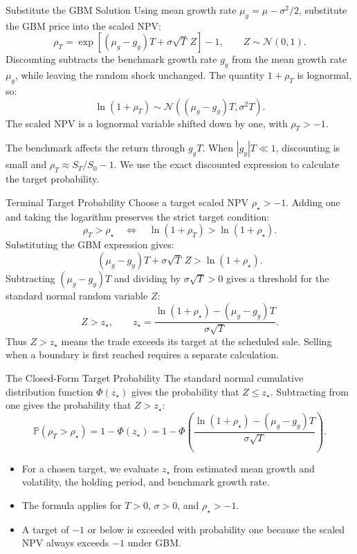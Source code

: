 \documentclass[aspectratio=169,11pt]{beamer}
\newcommand{\Pmeasure}{\mathbb{P}}
\newcommand{\mug}{\mu_g}
\begin{document}
\begin{frame}{Substitute the GBM Solution}
  Using mean growth rate $\mug=\mu-\sigma^2/2$, substitute the GBM price into
  the scaled NPV:
  \[
    \boxed{\rho_T=\exp\!\left[(\mug-g_y)T+\sigma\sqrt T\,Z\right]-1,
      \qquad Z\sim\mathcal N(0,1).}
  \]
  Discounting subtracts the benchmark growth rate $g_y$ from the mean growth
  rate $\mug$, while leaving the random shock unchanged. The quantity
  $1+\rho_T$ is lognormal, so:
  \[
    \ln(1+\rho_T)\sim\mathcal N\!\left((\mug-g_y)T,\sigma^2T\right).
  \]
  The scaled NPV is a lognormal variable shifted down by one, with
  $\rho_T>-1$.

  \vspace{0.5em}
  The benchmark affects the return through $g_yT$. When $|g_y|T\ll1$,
  discounting is small and $\rho_T\approx S_T/S_0-1$. We use the exact
  discounted expression to calculate the target probability.
\end{frame}

\begin{frame}{Terminal Target Probability}
  Choose a target scaled NPV $\rho_\star>-1$. Adding one and taking the
  logarithm preserves the strict target condition:
  \[
    \rho_T>\rho_\star
    \quad\Longleftrightarrow\quad
    \ln(1+\rho_T)>\ln(1+\rho_\star).
  \]
  Substituting the GBM expression gives:
  \[
    (\mug-g_y)T+\sigma\sqrt T\,Z>\ln(1+\rho_\star).
  \]
  Subtracting $(\mug-g_y)T$ and dividing by $\sigma\sqrt T>0$ gives a
  threshold for the standard normal random variable $Z$:
  \[
    Z>z_\star,\qquad
    \boxed{z_\star=\frac{\ln(1+\rho_\star)-(\mug-g_y)T}{\sigma\sqrt T}.}
  \]
  Thus $Z>z_\star$ means the trade exceeds its target at the scheduled sale.
  Selling when a boundary is first reached requires a separate calculation.
\end{frame}

\begin{frame}{The Closed-Form Target Probability}
  The standard normal cumulative distribution function $\Phi(z_\star)$ gives
  the probability that $Z\le z_\star$. Subtracting from one gives the
  probability that $Z>z_\star$:
  \[
    \boxed{\Pmeasure(\rho_T>\rho_\star)
      =1-\Phi(z_\star)
      =1-\Phi\!\left(
        \frac{\ln(1+\rho_\star)-(\mug-g_y)T}{\sigma\sqrt T}\right).}
  \]

  \vspace{0.4em}
  \begin{itemize}\setlength{\itemsep}{0.5em}
    \item For a chosen target, we evaluate $z_\star$ from estimated mean growth
      and volatility, the holding period, and benchmark growth rate.
    \item The formula applies for $T>0$, $\sigma>0$, and $\rho_\star>-1$.
    \item A target of $-1$ or below is exceeded with probability one because
      the scaled NPV always exceeds $-1$ under GBM.
  \end{itemize}
\end{frame}
\end{document}

